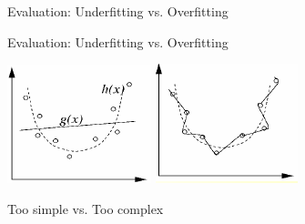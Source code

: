 \documentclass{beamer}
\begin{document}

% 
% 



\begin{frame}{Evaluation: Underfitting vs. Overfitting}

Evaluation: Underfitting vs. Overfitting

\begin{center}
\includegraphics[width=.35\textwidth]{figs/underfitting}
\includegraphics[width=.35\textwidth]{figs/overfitting}

Too simple vs. Too complex
\end{center}

\end{frame}

\end{document}
